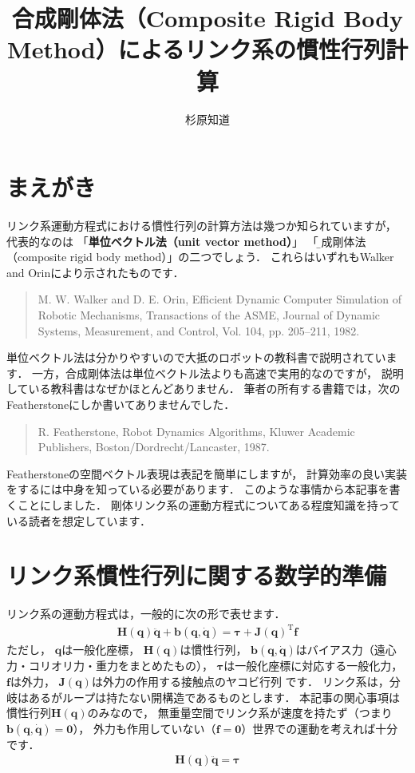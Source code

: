 \documentclass{jsarticle}
\title{\Large {\bf 合成剛体法（Composite Rigid Body Method）によるリンク系の慣性行列計算}}
\author{杉原知道}
\begin{document}
\maketitle

\section{まえがき}

リンク系運動方程式における慣性行列の計算方法は幾つか知られていますが，
代表的なのは
「{\bf 単位ベクトル法（unit vector method）}」
「{\b 合成剛体法（composite rigid body method）}」の二つでしょう．
これらはいずれもWalker and Orinにより示されたものです．
\begin{quote}
M. W. Walker and D. E. Orin,
Efficient Dynamic Computer Simulation of Robotic Mechanisms,
Transactions of the ASME, Journal of Dynamic Systems, Measurement, and Control,
Vol. 104, pp. 205--211, 1982.
\end{quote}
単位ベクトル法は分かりやすいので大抵のロボットの教科書で説明されています．
一方，合成剛体法は単位ベクトル法よりも高速で実用的なのですが，
説明している教科書はなぜかほとんどありません．
筆者の所有する書籍では，次のFeatherstoneにしか書いてありませんでした．
\begin{quote}
R. Featherstone,
Robot Dynamics Algorithms,
Kluwer Academic Publishers, Boston/Dordrecht/Lancaster, 1987.
\end{quote}
Featherstoneの空間ベクトル表現は表記を簡単にしますが，
計算効率の良い実装をするには中身を知っている必要があります．
このような事情から本記事を書くことにしました．
剛体リンク系の運動方程式についてある程度知識を持っている読者を想定しています．


\section{リンク系慣性行列に関する数学的準備}

リンク系の運動方程式は，一般的に次の形で表せます．
\begin{align*}
\bm{H}(\bm{q})\ddot{\bm{q}}+\bm{b}(\bm{q},\dot{\bm{q}})=\bm{\tau}+\bm{J}(\bm{q})^{\mathrm{T}}\bm{f}
\end{align*}
ただし，
$\bm{q}$は一般化座標，
$\bm{H}(\bm{q})$は慣性行列，
$\bm{b}(\bm{q},\dot{\bm{q}})$はバイアス力（遠心力・コリオリ力・重力をまとめたもの），
$\bm{\tau}$は一般化座標に対応する一般化力，
$\bm{f}$は外力，
$\bm{J}(\bm{q})$は外力の作用する接触点のヤコビ行列
です．
リンク系は，分岐はあるがループは持たない開構造であるものとします．
本記事の関心事項は慣性行列$\bm{H}(\bm{q})$のみなので，
無重量空間でリンク系が速度を持たず（つまり$\bm{b}(\bm{q},\dot{\bm{q}})=\bm{0}$），
外力も作用していない（$\bm{f}=\bm{0}$）世界での運動を考えれば十分です．
\begin{align*}
\bm{H}(\bm{q})\ddot{\bm{q}}=\bm{\tau}
\end{align*}
\end{document}
